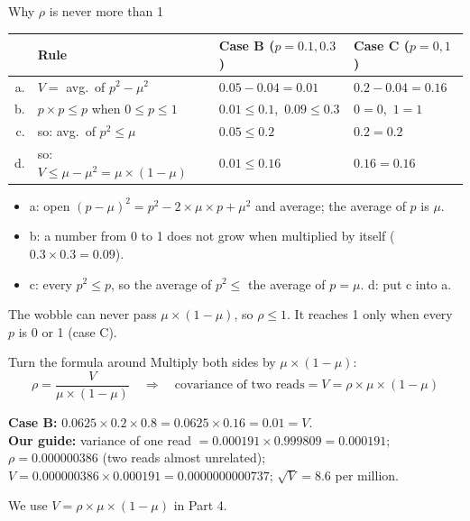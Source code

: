 \documentclass[aspectratio=169,11pt]{beamer}
\begin{document}
\begin{frame}{Why $\rho$ is never more than 1}
\small
\renewcommand{\arraystretch}{1.15}
\begin{tabular}{@{}r@{\;}l l l@{}}
\toprule
& Rule & Case B ($p = 0.1, 0.3$) & Case C ($p = 0, 1$)\\
\midrule
a. & $V = $ avg.\ of $p^2 - \mu^2$ & $0.05 - 0.04 = 0.01$ & $0.2 - 0.04 = 0.16$\\
b. & $p \times p \le p$ when $0 \le p \le 1$ & $0.01 \le 0.1$,\ $0.09 \le 0.3$ & $0 = 0$,\ $1 = 1$\\
c. & so: avg.\ of $p^2 \le \mu$ & $0.05 \le 0.2$ & $0.2 = 0.2$\\
d. & so: $V \le \mu - \mu^2 = \mu \times (1-\mu)$ & $0.01 \le 0.16$ & $0.16 = 0.16$\\
\bottomrule
\end{tabular}

\smallskip
\begin{itemize}\footnotesize
\item a: open $(p-\mu)^2 = p^2 - 2\times\mu\times p + \mu^2$ and average;
  the average of $p$ is $\mu$.
\item b: a number from 0 to 1 does not grow when multiplied by itself
  ($0.3 \times 0.3 = 0.09$).
\item c: every $p^2 \le p$, so the average of $p^2 \le$ the average of $p = \mu$.
\quad d: put c into a.
\end{itemize}
\normalsize
The wobble can never pass $\mu \times (1-\mu)$, so $\rho \le 1$. It reaches
1 only when every $p$ is 0 or 1 (case C).
\end{frame}

\begin{frame}{Turn the formula around}
Multiply both sides by $\mu \times (1-\mu)$:
\[
\rho = \frac{V}{\mu \times (1-\mu)}
\quad\Longrightarrow\quad
\text{covariance of two reads} = V = \rho \times \mu \times (1-\mu)
\]
\begin{worked}[ 4d]
\textbf{Case B:} $0.0625 \times 0.2 \times 0.8 = 0.0625 \times 0.16 = 0.01 = V$.\\[2pt]
\textbf{Our guide:} variance of one read $= 0.000191 \times 0.999809 =
0.000191$; $\rho = 0.000000386$ (two reads almost unrelated);
$V = 0.000000386 \times 0.000191 = 0.0000000000737$; $\sqrt{V} = 8.6$ per
million.
\end{worked}
We use $V = \rho \times \mu \times (1-\mu)$ in Part 4.
\end{frame}
\end{document}
